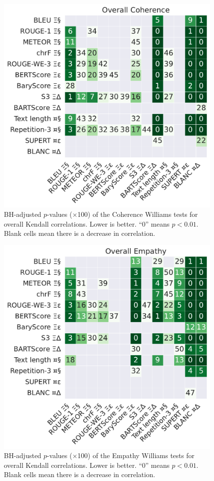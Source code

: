 \begin{figure}[h]
    \centering
    \includegraphics[width=0.62\columnwidth]{pictures/williams_overall_kendall_Coherence.pdf}
    \caption{BH-adjusted $p$-values ($\times$100) of the Coherence Williams tests for overall Kendall correlations. Lower is better. ``0'' means $p<0.01$. Blank cells mean there is a decrease in correlation.}
    \label{fig:williams_overall_coherence}
\end{figure}

\begin{figure}[h]
    \centering
    \includegraphics[width=0.62\columnwidth]{pictures/williams_overall_kendall_Empathy.pdf}
    \caption{BH-adjusted $p$-values ($\times$100) of the Empathy Williams tests for overall Kendall correlations. Lower is better. ``0'' means $p<0.01$. Blank cells mean there is a decrease in correlation.}
    \label{fig:williams_overall_empathy}
\end{figure}

